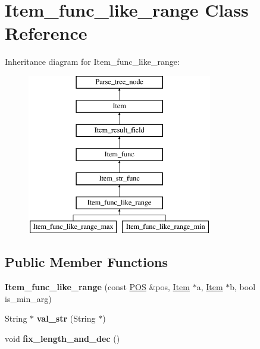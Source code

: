 \hypertarget{classItem__func__like__range}{}\section{Item\+\_\+func\+\_\+like\+\_\+range Class Reference}
\label{classItem__func__like__range}
Inheritance diagram for Item\+\_\+func\+\_\+like\+\_\+range\+:\begin{figure}[H]
\begin{center}
\leavevmode
\includegraphics[height=7.000000cm]{classItem__func__like__range}
\end{center}
\end{figure}
\subsection*{Public Member Functions}
\begin{DoxyCompactItemize}
\item 
\mbox{\label{classItem__func__like__range_a5b73068cad06a8447f8b0f4eb7d4d7fb}} 
{\bfseries Item\+\_\+func\+\_\+like\+\_\+range} (const \mbox{\hyperlink{structYYLTYPE}{P\+OS}} \&pos, \mbox{\hyperlink{classItem}{Item}} $\ast$a, \mbox{\hyperlink{classItem}{Item}} $\ast$b, bool is\+\_\+min\+\_\+arg)
\item 
\mbox{\label{classItem__func__like__range_a1f54df65a95ee0ca3d7592f444e0e3e2}} 
String $\ast$ {\bfseries val\+\_\+str} (String $\ast$)
\item 
\mbox{\label{classItem__func__like__range_a14bc46d50ff50f1e12d22c880d7e652e}} 
void {\bfseries fix\+\_\+length\+\_\+and\+\_\+dec} ()
\end{DoxyCompactItemize}
